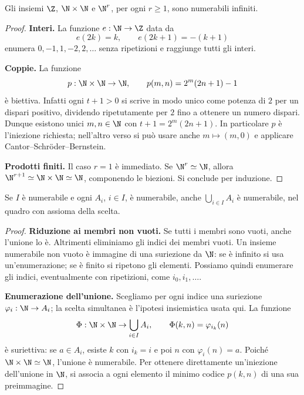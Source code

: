 \begin{proposizione}
Gli insiemi $\Z$, $\N\times\N$ e $\N^r$, per ogni $r\ge1$, sono numerabili infiniti.
\end{proposizione}
\begin{proof}
\textbf{Interi.} La funzione $e:\N\to\Z$ data da
\[
e(2k)=k,\qquad e(2k+1)=-(k+1)
\]
enumera $0,-1,1,-2,2,\ldots$ senza ripetizioni e raggiunge tutti gli interi.

\textbf{Coppie.} La funzione
\[
p:\N\times\N\to\N,\qquad p(m,n)=2^m(2n+1)-1
\]
è biettiva. Infatti ogni $t+1>0$ si scrive in modo unico come potenza di $2$ per un dispari positivo, dividendo ripetutamente per $2$ fino a ottenere un numero dispari. Dunque esistono unici $m,n\in\N$ con $t+1=2^m(2n+1)$. In particolare $p$ è l'iniezione richiesta; nell'altro verso si può usare anche $m\mapsto(m,0)$ e applicare Cantor--Schröder--Bernstein.

\textbf{Prodotti finiti.} Il caso $r=1$ è immediato. Se $\N^r\simeq\N$, allora $\N^{r+1}\simeq\N\times\N\simeq\N$, componendo le biezioni. Si conclude per induzione.
\end{proof}

\begin{schema}
\end{schema}

\begin{teorema}\label{teo:unione-numerabile}
Se $I$ è numerabile e ogni $A_i$, $i\in I$, è numerabile, anche $\bigcup_{i\in I}A_i$ è numerabile, nel quadro con assioma della scelta.
\end{teorema}
\begin{proof}
\textbf{Riduzione ai membri non vuoti.} Se tutti i membri sono vuoti, anche l'unione lo è. Altrimenti eliminiamo gli indici dei membri vuoti. Un insieme numerabile non vuoto è immagine di una suriezione da $\N$: se è infinito si usa un'enumerazione; se è finito si ripetono gli elementi. Possiamo quindi enumerare gli indici, eventualmente con ripetizioni, come $i_0,i_1,\ldots$.

\textbf{Enumerazione dell'unione.} Scegliamo per ogni indice una suriezione $\varphi_i:\N\to A_i$; la scelta simultanea è l'ipotesi insiemistica usata qui. La funzione
\[
\Phi:\N\times\N\to\bigcup_{i\in I}A_i,\qquad
\Phi(k,n)=\varphi_{i_k}(n)
\]
è suriettiva: se $a\in A_i$, esiste $k$ con $i_k=i$ e poi $n$ con $\varphi_i(n)=a$. Poiché $\N\times\N\simeq\N$, l'unione è numerabile. Per ottenere direttamente un'iniezione dell'unione in $\N$, si associa a ogni elemento il minimo codice $p(k,n)$ di una sua preimmagine.
\end{proof}

